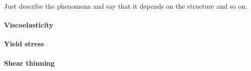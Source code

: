 Just describe the phenomena and say that it depends on the structure and so on.

\paragraph{Viscoelasticity}

\paragraph{Yield stress}

\paragraph{Shear thinning}

